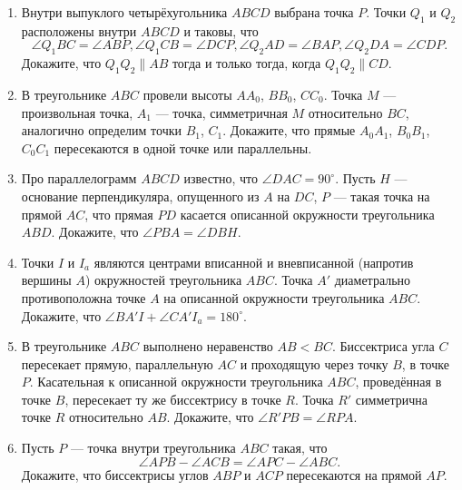 \documentclass{article}
\begin{document}
\begin{enumerate}[label*=\protect\fbox{\arabic{enumi}}]
\item Внутри выпуклого четырёхугольника $ABCD$ выбрана точка $P$. Точки $Q_1$ и $Q_2$ расположены внутри $ABCD$ и таковы, что
$$\angle Q_1BC=\angle ABP, \angle Q_1CB=\angle DCP, \angle Q_2AD=\angle BAP, \angle Q_2DA=\angle CDP.$$ Докажите, что $Q_1Q_2\parallel AB$ тогда и только тогда, когда $Q_1Q_2\parallel CD$.


\item В треугольнике $ABC$ провели высоты $AA_0$, $BB_0$, $CC_0$. Точка $M$ — произвольная точка, $A_1$ — точка, симметричная $M$ относительно $BC$, аналогично определим точки $B_1$, $C_1$. Докажите, что прямые $A_0A_1$, $B_0B_1$, $C_0C_1$ пересекаются в одной точке или параллельны.

\item Про параллелограмм \(ABCD\) известно, что \(\angle DAC=90^\circ\). Пусть \(H\) — основание перпендикуляра, опущенного из \(A\) на \(DC\), \(P\) — такая точка на прямой \(AC\), что прямая \(PD\) касается описанной окружности треугольника \(ABD\). Докажите, что \(\angle PBA=\angle DBH\).

\item Точки \(I\) и \(I_a\) являются центрами вписанной и вневписанной (напротив вершины \(A\)) окружностей треугольника \(ABC\). Точка \(A'\) диаметрально противоположна точке \(A\) на описанной окружности треугольника \(ABC\). Докажите, что \(\angle BA'I+\angle CA'I_a=180^\circ\).

\item В треугольнике \(ABC\) выполнено неравенство \(AB<BC\). Биссектриса угла \(C\) пересекает прямую, параллельную \(AC\) и проходящую через точку \(B\), в точке \(P\). Касательная к описанной окружности треугольника \(ABC\), проведённая в точке \(B\), пересекает ту же биссектрису в точке \(R\). Точка \(R'\) симметрична точке \(R\) относительно \(AB\). Докажите, что \(\angle R'PB=\angle RPA\).

\item Пусть \(P\) — точка внутри треугольника \(ABC\) такая, что
$$\angle APB-\angle ACB=\angle APC-\angle ABC.$$
Докажите, что биссектрисы углов \(ABP\) и \(ACP\) пересекаются на прямой \(AP\).

\end{enumerate}
\end{document}
